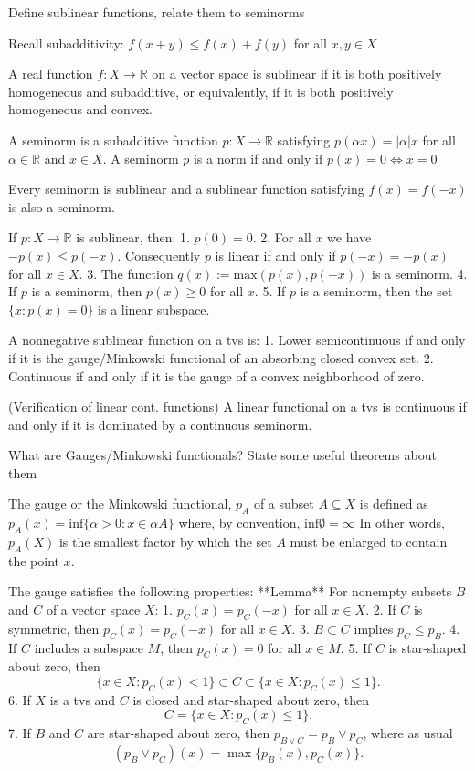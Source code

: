 Define sublinear functions, relate them to seminorms

Recall subadditivity: \( f(x + y) \leq f(x) + f(y) \) for all \( x, y \in X \)

A real function \( f : X \to \mathbb{R} \) on a vector space is sublinear if it is both
positively homogeneous and subadditive, or equivalently, if it is both positively
homogeneous and convex.

A seminorm is a subadditive function \( p : X \to \mathbb{R} \) satisfying
\( p(\alpha x) = |\alpha|x \)
for all \( \alpha \in \mathbb{R} \) and \( x \in X \).
A seminorm \( p \) is a norm if and only if \( p(x) = 0 \iff x = 0 \)

Every seminorm is sublinear and a sublinear function satisfying \( f(x) = f(-x) \) is also a seminorm.

If \( p : X \to \mathbb{R} \) is sublinear, then:
1. \( p(0) = 0 \).
2. For all \( x \) we have \( - p(x) \leq p(-x) \). Consequently \( p \) is linear if and only if
\( p(-x) = - p(x) \) for all \( x \in X \).
3. The function \( q(x) := \text{max}(p(x), p(-x)) \) is a seminorm.
4. If \( p \) is a seminorm, then \( p(x) \geq 0 \) for all \( x \).
5. If \( p \) is a seminorm, then the set \( \{ x : p(x) = 0\} \) is a linear subspace.

A nonnegative sublinear function on a tvs is:
1. Lower semicontinuous if and only if it is the gauge/Minkowski functional of an absorbing closed
convex set.
2. Continuous if and only if it is the gauge of a convex neighborhood of zero.

(Verification of linear cont. functions)
A linear functional on a tvs is continuous if and only if it is dominated by a continuous seminorm.



What are Gauges/Minkowski functionals? State some useful theorems about them

The gauge or the Minkowski functional, \( p_A \) of a subset \( A \subseteq X \) 
is defined as
\( p_A(x) = \text{inf} \{ \alpha > 0 : x \in \alpha A\} \)
where, by convention, \( \text{inf} \emptyset = \infty \) 
In other words, \( p_A(X) \) is the smallest factor by which the set \( A \) 
must be enlarged to contain the point \( x \).

The gauge satisfies the following properties:
**Lemma**  
For nonempty subsets \( B \) and \( C \) of a vector space \( X \):
1. \( p_C(x) = p_C(-x) \) for all \( x \in X \).
2. If \( C \) is symmetric, then \( p_C(x) = p_C(-x) \) for all \( x \in X \).
3. \( B \subset C \) implies \( p_C \leq p_B \).
4. If \( C \) includes a subspace \( M \), then \( p_C(x) = 0 \) for all \( x \in M \).
5. If \( C \) is star-shaped about zero, then  
   \[
   \{ x \in X : p_C(x) < 1 \} \subset C \subset \{ x \in X : p_C(x) \leq 1 \}.
   \]
6. If \( X \) is a tvs and \( C \) is closed and star-shaped about zero, then  
   \[
   C = \{ x \in X : p_C(x) \leq 1 \}.
   \]
7. If \( B \) and \( C \) are star-shaped about zero, then \( p_{B \vee C} = p_B \vee p_C \), where as usual  
   \[
   (p_B \vee p_C)(x) = \max \{ p_B(x), p_C(x) \}.
   \]


